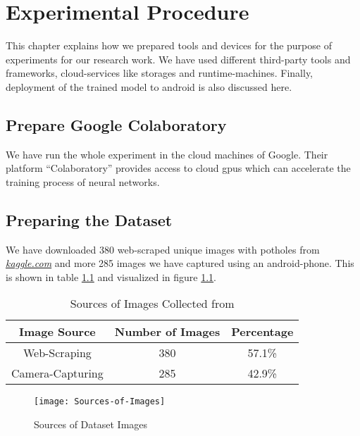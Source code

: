 \chapter{Experimental Procedure}
    This chapter explains how we prepared tools and devices for the purpose of experiments for our research work. We have used different third-party tools and frameworks, cloud-services like storages and runtime-machines. Finally, deployment of the trained model to android is also discussed here.
        
    \section{Prepare Google Colaboratory}
        We have run the whole experiment in the cloud machines of Google. Their platform ``Colaboratory'' provides access to cloud \acrshort{gpu}s which can accelerate the training process of neural networks.
    
    \section{Preparing the Dataset}
        We have downloaded 380 web-scraped unique images with potholes from \href{https://kaggle.com}{\itshape{kaggle.com}} and more 285 images we have captured using an android-phone. This is shown in table \ref{tab:img_sources} and visualized in figure \ref{fig:image_sources}.
        
        \begin{table}[h]
            \centering
            \begin{tabular}{|c|c|c|} \hline
                Image Source &  Number of Images & Percentage \\\hline\hline
                Web-Scraping & 380 & 57.1\% \\\hline
                Camera-Capturing & 285 & 42.9\% \\\hline
            \end{tabular}
            \caption{Sources of Images Collected from}
            \label{tab:img_sources}
        \end{table}
        
        \begin{figure}
            \centering
            \texttt{[image: Sources-of-Images]}
            \caption{Sources of Dataset Images}
            \label{fig:image_sources}
        \end{figure}
        
